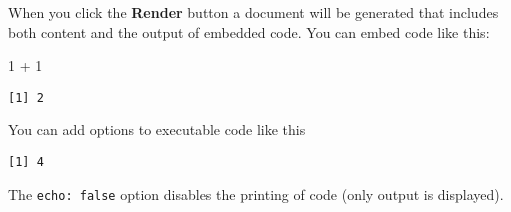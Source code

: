 \documentclass[
  a4paper,
  DIV=11,
  numbers=noendperiod]{scrartcl}
\newenvironment{Shaded}{\begin{snugshade}}{\end{snugshade}}
\newcommand{\DecValTok}[1]{\textcolor[rgb]{0.68,0.00,0.00}{#1}}
\newcommand{\SpecialCharTok}[1]{\textcolor[rgb]{0.37,0.37,0.37}{#1}}
\begin{document}
When you click the \textbf{Render} button a document will be generated
that includes both content and the output of embedded code. You can
embed code like this:

\begin{Shaded}
\begin{Highlighting}[]
\DecValTok{1} \SpecialCharTok{+} \DecValTok{1}
\end{Highlighting}
\end{Shaded}

\begin{verbatim}
[1] 2
\end{verbatim}

You can add options to executable code like this

\begin{verbatim}
[1] 4
\end{verbatim}

The \texttt{echo:\ false} option disables the printing of code (only
output is displayed).
\end{document}
